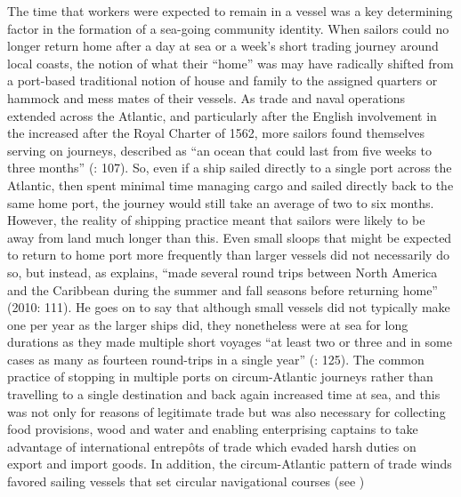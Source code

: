 The time that workers were expected to remain in a vessel was a key determining factor in the formation of a sea-going community identity. When sailors could no longer return home after a day at sea or a week’s short trading journey around local coasts, the notion of what their “home” was may have radically shifted from a port-based traditional notion of house and family to the assigned quarters or hammock and mess mates of their vessels. As trade and naval operations extended across the Atlantic, and particularly after the English involvement in the  increased after the Royal Charter of 1562, more sailors found themselves serving on  journeys, described as “an ocean  that could last from five weeks to three months” (\citealt{Brown2011}: 107). So, even if a ship sailed directly to a single port across the Atlantic, then spent minimal time managing cargo and sailed directly back to the same home port, the journey would still take an average of two to six months. However, the reality of shipping practice meant that sailors were likely to be away from land much longer than this. Even small sloops that might be expected to return to home port more frequently than larger vessels did not necessarily do so, but instead, as \citeauthor{Jarvis2010} explains, “made several round trips between North America and the Caribbean during the summer and fall seasons before returning home” (2010: 111).  He goes on to say that although small vessels did not typically make one   per year as the larger ships did, they nonetheless were at sea for long durations as they made multiple short voyages “at least two or three and in some cases as many as fourteen round-trips in a single year” (\citealt{Jarvis2010}: 125). The common practice of stopping in multiple ports on circum-Atlantic journeys rather than travelling to a single destination and back again increased time at sea, and this was not only for reasons of legitimate trade but was also necessary for collecting food provisions, wood and water and enabling enterprising captains to take advantage of international entrepôts of trade which evaded harsh duties on export and import goods. In addition, the circum-Atlantic pattern of trade winds favored sailing vessels that set circular navigational courses (see ) 


